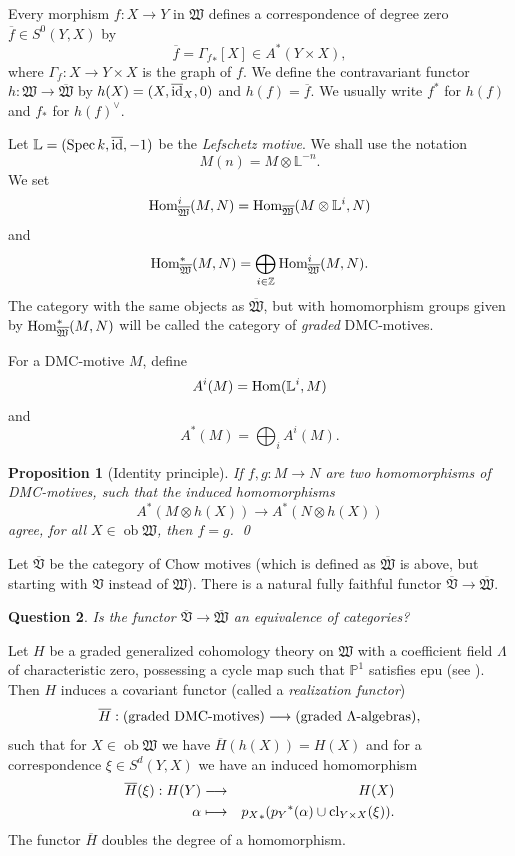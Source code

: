 \documentclass[11pt]{amsart}
\newtheorem{prop}{Proposition}[section]
\newtheorem{question}[prop]{Question}
\theoremstyle{definition}
\theoremstyle{remark}
\newcommand{\rtext}[1]{\text{\upshape #1}}
\newcommand{\upst}{^{\ast}}
\newcommand{\lst}{_{\ast}}
\newcommand{\VV}{{\mathfrak{V}}}
\newcommand{\WW}{{\mathfrak{W}}}
\newcommand{\zz}{{\mathbb{Z}}}
\renewcommand{\ll}{{\mathbb{L}}}
\newcommand{\pp}{{\mathbb{P}}}
\newcommand{\cl}{\operatorname{\rm cl}\nolimits}
\newcommand{\ob}{\operatorname{ob}}
\newcommand{\spec}{\operatorname{\rm Spec}\nolimits}
\newcommand{\id}{\operatorname{\rm id}}
\newcommand{\Hom}{\operatorname{\rm Hom}\nolimits}
\newcommand{\ol}{\overline}
\theoremstyle{plain}
\theoremstyle{definition}
\theoremstyle{remark}
\begin{document}
Every morphism \(f:X\rightarrow Y\) in \(\WW\) defines a correspondence of degree
zero \(\ol{f}\in S^0(Y,X)\) by
\[
\ol{f}={\Gamma_f}\lst[X]\in A\upst(Y\times X),
\]
where \(\Gamma_f:X\rightarrow Y\times X\) is the graph of \(f\).
We define the contravariant functor \(h:\WW\rightarrow\ol{\WW}\) by
\(h(X)=(X,\ol{\id}_X,0)\) and \(h(f)=\ol{f}\). We usually
write \(f\upst\) for \(h(f)\) and \(f\lst\) for \(h(f)^{\vee}\).

Let \(\ll=(\spec k,\ol{\id},-1)\) be the {\em Lefschetz motive}.  We shall use
the notation
\[
M(n)=M\otimes\ll^{-n}.
\]
We set
\[
\Hom_{\ol{\WW}}^i(M,N)=\Hom_{\ol{\WW}}(M\otimes\ll^i,N)
\]
and
\[
\Hom_{\ol{\WW}}\upst(M,N)=\bigoplus_{i\in\zz}\Hom_{\ol{\WW}}^i(M,N).
\]
The category with the same objects as \(\ol{\WW}\), but with homomorphism groups
given by \(\Hom_{\ol{\WW}}\upst(M,N)\) will be called the
category of {\em graded }DMC-motives.

For a DMC-motive \(M\), define
\[
A^i(M)=\Hom(\ll^i,M)
\]
and
\[
A\upst(M)=\bigoplus_iA^i(M).
\]

\begin{prop}[Identity principle]
If \(f,g:M\rightarrow N\) are two homomorphisms of DMC-motives, such that the
induced homomorphisms
\[
A\upst(M\otimes h(X))\longrightarrow A\upst(N\otimes h(X))
\]
agree, for all \(X\in\ob\WW\), then \(f=g\). \qed
\end{prop}

Let \(\ol{\VV}\) be the category of Chow motives (which is defined as \(\ol{\WW}\)
is above, but starting with \(\VV\) instead
of \(\WW\)). There is a natural fully faithful functor
\(\ol{\VV}\rightarrow\ol{\WW}\).

\begin{question}
Is the functor \(\ol{\VV}\rightarrow\ol{\WW}\) an equivalence of categories?
\end{question}

Let \(H\) be a graded generalized cohomology theory on \(\WW\) with a coefficient
field \(\Lambda\) of characteristic zero,
possessing a cycle map such that \(\pp^1\) satisfies epu (see \cite{kleiman}).
Then \(H\) induces a covariant functor
(called a {\em realization functor\/})
\[
\ol{H}:(\rtext{graded DMC-motives})\longrightarrow(\rtext{graded
\(\Lambda\)-algebras}),
\]
such that for \(X\in\ob\WW\) we have \(\ol{H}(h(X))=H(X)\) and for a correspondence
\(\xi\in S^d(Y,X)\) we have an induced
homomorphism
\begin{eqnarray*}
\ol{H}(\xi):H(Y) & \longrightarrow & H(X) \\
\alpha           & \longmapsto     &
{p_X}\lst({p_Y}\upst(\alpha)\cup\cl_{Y\times X}(\xi)).
\end{eqnarray*}
The functor \(\ol{H}\) doubles the degree of a homomorphism.
\end{document}
